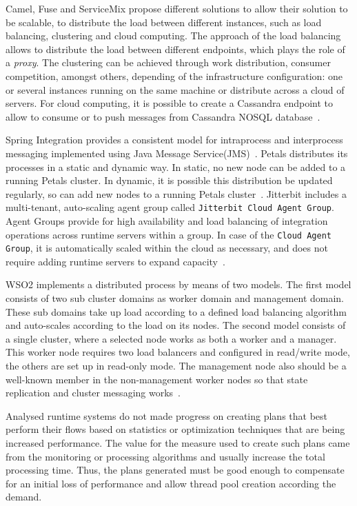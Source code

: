 Camel, Fuse and ServiceMix propose different solutions to allow their solution to be scalable, to distribute the load between different instances, such as load balancing, clustering and cloud computing. The approach of the load balancing allows to distribute the load between different endpoints, which plays the role of a \textit{proxy}. The clustering can be achieved through work distribution, consumer competition, amongst others, depending of the infrastructure configuration: one or several instances running on the same machine or distribute across a cloud of servers. For cloud computing, it is possible to create a Cassandra endpoint to allow to consume or to push messages from Cassandra NOSQL database~\cite{Camel}. 

Spring Integration provides a consistent model for intraprocess and interprocess messaging implemented using Java Message Service(JMS)~\cite{fisher2012}. Petals distributes its processes in a static and dynamic way. In static, no new node can be added to a running Petals cluster. In dynamic, it is possible this distribution be updated regularly, so can add new nodes to a running Petals cluster~\cite{Petals}. Jitterbit includes a multi-tenant, auto-scaling agent group called \texttt{Jitterbit Cloud Agent Group}. Agent Groups provide for high availability and load balancing of integration operations across runtime servers within a group. In case of the \texttt{Cloud Agent Group}, it is automatically scaled within the cloud as necessary, and does not require adding runtime servers to expand capacity~\cite{Jitterbit}. 

WSO2 implements a distributed process by means of two models. The first model consists of two sub cluster domains as worker domain and management domain. These sub domains take up load according to a defined load balancing algorithm and auto-scales according to the load on its nodes. The second model consists of a single cluster, where a selected node works as both a worker and a manager. This worker node requires two load balancers and configured in read/write mode, the others are set up in read-only mode. The management node also should be a well-known member in the non-management worker nodes so that state replication and cluster messaging works~\cite{WSO2}.

Analysed runtime systems do not made progress on creating plans that best perform their flows based on statistics or optimization techniques that are being increased performance. The value for the measure used to create such plans came from the monitoring or processing algorithms and usually increase the total processing time. Thus, the plans generated must be good enough to compensate for an initial loss of performance and allow thread pool creation according the demand.

